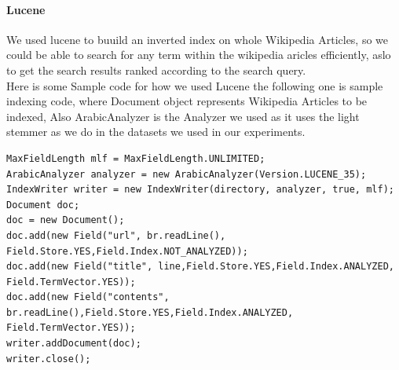 \paragraph{Lucene}
We used lucene to buuild an inverted index on whole Wikipedia Articles, so we could be able to search for any term within the wikipedia aricles efficiently, aslo to get the search results ranked according to the search query.\\
Here is some Sample code for how we used Lucene the following one is sample indexing code, where Document object represents Wikipedia Articles to be indexed, Also ArabicAnalyzer is the Analyzer we used as it uses the light stemmer as we do in the datasets we used in our experiments.\\

\begin{lstlisting}
MaxFieldLength mlf = MaxFieldLength.UNLIMITED;
ArabicAnalyzer analyzer = new ArabicAnalyzer(Version.LUCENE_35);
IndexWriter writer = new IndexWriter(directory, analyzer, true, mlf);
Document doc;
doc = new Document();
doc.add(new Field("url", br.readLine(),	Field.Store.YES,Field.Index.NOT_ANALYZED));
doc.add(new Field("title", line,Field.Store.YES,Field.Index.ANALYZED, Field.TermVector.YES));
doc.add(new Field("contents", br.readLine(),Field.Store.YES,Field.Index.ANALYZED, Field.TermVector.YES));
writer.addDocument(doc);
writer.close();
\end{lstlisting}

